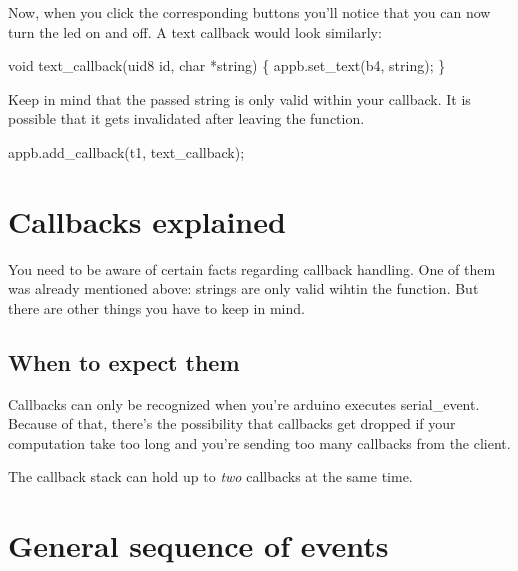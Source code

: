 Now, when you click the corresponding buttons you'll notice that you can now turn the led on and off. A text callback would look similarly\+:


\begin{DoxyCode}
\textcolor{keywordtype}{void} text\_callback(uid8 \textcolor{keywordtype}{id}, \textcolor{keywordtype}{char} *\textcolor{keywordtype}{string})
\{
    appb.set\_text(b4, \textcolor{keywordtype}{string});
\}
\end{DoxyCode}


Keep in mind that the passed string is only valid within your callback. It is possible that it gets invalidated after leaving the function.


\begin{DoxyCode}
appb.add\_callback(t1, text\_callback);
\end{DoxyCode}


\section*{Callbacks explained}

You need to be aware of certain facts regarding callback handling. One of them was already mentioned above\+: strings are only valid wihtin the function. But there are other things you have to keep in mind.

\subsection*{When to expect them}

Callbacks can only be recognized when you're arduino executes {\ttfamily serial\+\_\+event}. Because of that, there's the possibility that callbacks get dropped if your computation take too long and you're sending too many callbacks from the client.

 The callback stack can hold up to {\itshape two} callbacks at the same time.

\section*{General sequence of events}

